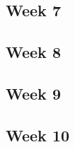 \documentclass[letterpaper,10pt,draftclsnofoot,onecolumn,titlepage]{IEEEtran}
\begin{document}
			\subsection{Week 7}
			
			\subsection{Week 8}
			
			\subsection{Week 9}
			
			\subsection{Week 10}
		
		
		
\end{document}
